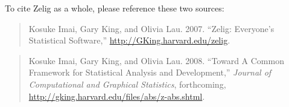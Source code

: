 To cite Zelig as a whole, please reference these two sources:
\begin{verse}
  Kosuke Imai, Gary King, and Olivia Lau. 2007. ``Zelig: Everyone's
  Statistical Software,'' \url{http://GKing.harvard.edu/zelig}.
\end{verse}
\begin{verse}
  Kosuke Imai, Gary King, and Olivia Lau. 2008. ``Toward A Common
  Framework for Statistical Analysis and Development,'' \emph{Journal
    of Computational and Graphical Statistics}, forthcoming,
  \url{http://gking.harvard.edu/files/abs/z-abs.shtml}.
\end{verse}
